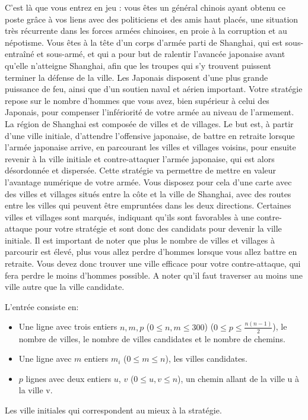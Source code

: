 C’est là que vous entrez en jeu : vous êtes un général chinois ayant obtenu ce poste grâce à vos liens avec des politiciens et des amis haut placés, une situation très récurrente dans les forces armées chinoises, en proie à la corruption et au népotisme.
Vous êtes à la tête d’un corps d’armée parti de Shanghai, qui est sous-entraîné et sous-armé, et qui a pour but de ralentir l’avancée japonaise avant qu’elle n’atteigne Shanghai, afin que les troupes qui s’y trouvent puissent terminer la défense de la ville.
Les Japonais disposent d’une plus grande puissance de feu, ainsi que d’un soutien naval et aérien important.
Votre stratégie repose sur le nombre d’hommes que vous avez, bien supérieur à celui des Japonais, pour compenser l’infériorité de votre armée au niveau de l’armement.
La région de Shanghai est composée de villes et de villages. Le but est, à partir d’une ville initiale, d’attendre l’offensive japonaise, de battre en retraite lorsque l’armée japonaise arrive, en parcourant les villes et villages voisins, pour ensuite revenir à la ville initiale et contre-attaquer l’armée japonaise, qui est alors désordonnée et dispersée. Cette stratégie va permettre de mettre en valeur l’avantage numérique de votre armée. Vous disposez pour cela d’une carte avec des villes et villages situés entre la côte et la ville de Shanghai, avec des routes entre les villes qui peuvent être empruntées dans les deux directions. Certaines villes et villages sont marqués, indiquant qu’ils sont favorables à une contre-attaque pour votre stratégie et sont donc des candidats pour devenir la ville initiale. Il est important de noter que plus le nombre de villes et villages à parcourir est élevé, plus vous allez perdre d’hommes lorsque vous allez battre en retraite. Vous devez donc trouver une ville efficace pour votre contre-attaque, qui fera perdre le moins d’hommes possible. A noter qu'il faut traverser au moins une ville autre que la ville candidate.

\begin{Input}
    L'entrée consiste en:
    \begin{itemize}
        \item Une ligne avec trois entiers $n, m, p$ ($0\leq n, m\leq 300$) ($0 \leq p \leq \frac{n (n-1)}{2}$), le nombre de villes, le nombre de villes candidates et le nombre de chemins.
        \item Une ligne avec $m$ entiers $m_i$ ($0 \leq m \leq n$), les villes candidates.
        \item $p$ lignes avec deux entiers $u$, $v$ ($0 \leq u, v \leq n$), un chemin allant de la ville u à la ville v.
    \end{itemize}
\end{Input}

\begin{Output}
    Les ville initiales qui correspondent au mieux à la stratégie.
\end{Output}
